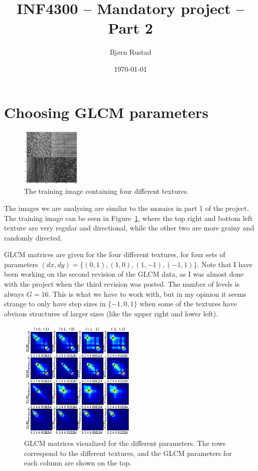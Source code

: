 \documentclass[a4paper]{article}
\title{INF4300 -- Mandatory project -- Part 2}
\author{Bjørn Rustad}
\date{\today}
\begin{document}
\maketitle

\section{Choosing GLCM parameters}

\begin{figure}[h]
    \centering
    \includegraphics[width=0.25\textwidth]{mosaic1.png}
    \caption{The training image containing four different textures.}
    \label{fig:train_tex}
\end{figure}

The images we are analysing are similar to the mosaics in part 1 of the
project. The training image can be seen in Figure~\ref{fig:train_tex},
where the top right and bottom left texture are very regular and
directional, while the other two are more grainy and randomly directed.

GLCM matrices are given for the four different textures, for four sets
of parameters $(dx, dy) = \{(0, 1), (1, 0), (1, -1), (-1, 1)\}$. Note
that I have been working on the second revision of the GLCM data, as I
was almost done with the project when the third revision was posted. The
number of levels is always $G = 16$. This is what we have to work with,
but in my opinion it seems strange to only have step sizes in $\{-1, 0,
1\}$ when some of the textures have obvious structures of larger sizes
(like the upper right and lower left).

\begin{figure}
    \centering
    \includegraphics[width=0.5\textwidth]{glcm_mat.png}
    \caption{%
        GLCM matrices visualized for the different parameters. The rows
        correspond to the different textures, and the GLCM parameters
        for each column are shown on the top.
    }
    \label{fig:glcm_mat}
\end{figure}
\end{document}
